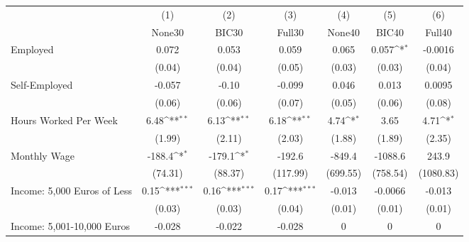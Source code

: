 {
\def\sym#1{\ifmmode^{#1}\else\(^{#1}\)\fi}
\begin{tabular}{l*{6}{c}}
\toprule
            &\multicolumn{1}{c}{(1)}&\multicolumn{1}{c}{(2)}&\multicolumn{1}{c}{(3)}&\multicolumn{1}{c}{(4)}&\multicolumn{1}{c}{(5)}&\multicolumn{1}{c}{(6)}\\
            &\multicolumn{1}{c}{None30}&\multicolumn{1}{c}{BIC30}&\multicolumn{1}{c}{Full30}&\multicolumn{1}{c}{None40}&\multicolumn{1}{c}{BIC40}&\multicolumn{1}{c}{Full40}\\
\midrule
Employed    &       0.072         &       0.053         &       0.059         &       0.065         &       0.057\sym{*}  &     -0.0016         \\
            &      (0.04)         &      (0.04)         &      (0.05)         &      (0.03)         &      (0.03)         &      (0.04)         \\
\addlinespace
Self-Employed&      -0.057         &       -0.10         &      -0.099         &       0.046         &       0.013         &      0.0095         \\
            &      (0.06)         &      (0.06)         &      (0.07)         &      (0.05)         &      (0.06)         &      (0.08)         \\
\addlinespace
Hours Worked Per Week&        6.48\sym{**} &        6.13\sym{**} &        6.18\sym{**} &        4.74\sym{*}  &        3.65         &        4.71\sym{*}  \\
            &      (1.99)         &      (2.11)         &      (2.03)         &      (1.88)         &      (1.89)         &      (2.35)         \\
\addlinespace
Monthly Wage&      -188.4\sym{*}  &      -179.1\sym{*}  &      -192.6         &      -849.4         &     -1088.6         &       243.9         \\
            &     (74.31)         &     (88.37)         &    (117.99)         &    (699.55)         &    (758.54)         &   (1080.83)         \\
\addlinespace
Income: 5,000 Euros of Less&        0.15\sym{***}&        0.16\sym{***}&        0.17\sym{***}&      -0.013         &     -0.0066         &      -0.013         \\
            &      (0.03)         &      (0.03)         &      (0.04)         &      (0.01)         &      (0.01)         &      (0.01)         \\
\addlinespace
Income: 5,001-10,000 Euros&      -0.028         &      -0.022         &      -0.028         &           0         &           0         &           0         \\

\end{tabular}}
